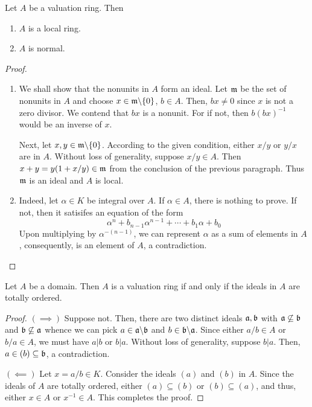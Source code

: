 \begin{proposition}
    Let $A$ be a valuation ring. Then 
    \begin{enumerate}[label=(\alph*)]
        \item $A$ is a local ring. 
        \item $A$ is normal.
    \end{enumerate}
\end{proposition}
\begin{proof}
\begin{enumerate}[label=(\alph*)]
    \item We shall show that the nonunits in $A$ form an ideal. Let $\mathfrak m$ be the set of nonunits in $A$ and choose $x\in\mathfrak m\backslash\{0\}$, $b\in A$. Then, $bx\ne 0$ since $x$ is not a zero divisor. We contend that $bx$ is a nonunit. For if not, then $b(bx)^{-1}$ would be an inverse of $x$.

    Next, let $x,y\in\mathfrak m\backslash\{0\}$. According to the given condition, either $x/y$ or $y/x$ are in $A$. Without loss of generality, suppose $x/y\in A$. Then $x + y = y(1 + x/y)\in\mathfrak m$ from the conclusion of the previous paragraph. Thus $\mathfrak m$ is an ideal and $A$ is local.

    \item Indeed, let $\alpha\in K$ be integral over $A$. If $\alpha\in A$, there is nothing to prove. If not, then it satisifes an equation of the form 
    \begin{equation*}
        \alpha^n + b_{n - 1}\alpha^{n - 1} + \cdots + b_1\alpha + b_0
    \end{equation*}
    Upon multiplying by $\alpha^{-(n - 1)}$, we can represent $\alpha$ as a sum of elements in $A$, consequently, is an element of $A$, a contradiction.
\end{enumerate}
\end{proof}

\begin{proposition}
    Let $A$ be a domain. Then $A$ is a valuation ring if and only if the ideals in $A$ are totally ordered.
\end{proposition}
\begin{proof}
    $(\implies)$ Suppose not. Then, there are two distinct ideals $\mathfrak a,\mathfrak b$ with $\mathfrak a\not\subseteq\mathfrak b$ and $\mathfrak b\not\subseteq\mathfrak a$ whence we can pick $a\in\mathfrak a\backslash\mathfrak b$ and $b\in\mathfrak b\backslash\mathfrak a$. Since either $a/b\in A$ or $b/a\in A$, we must have $a|b$ or $b|a$. Without loss of generality, suppose $b|a$. Then, $a\in(b)\subseteq\mathfrak b$, a contradiction. 

    $(\impliedby)$ Let $x = a/b\in K$. Consider the ideals $(a)$ and $(b)$ in $A$. Since the ideals of $A$ are totally ordered, either $(a)\subseteq (b)$ or $(b)\subseteq (a)$, and thus, either $x\in A$ or $x^{-1}\in A$. This completes the proof.
\end{proof}

